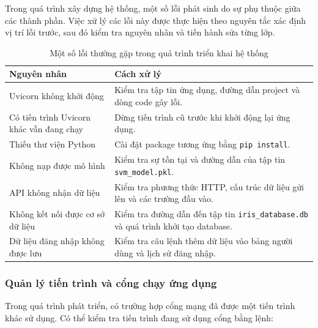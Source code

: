 \documentclass[14pt]{extarticle}
\begin{document}
	\noindent Trong quá trình xây dựng hệ thống, một số lỗi phát sinh do sự phụ thuộc giữa các thành phần. Việc xử lý các lỗi này được thực hiện theo nguyên tắc xác định vị trí lỗi trước, sau đó kiểm tra nguyên nhân và tiến hành sửa từng lớp.
	
	\begin{table}[H]
		\centering
		\caption{Một số lỗi thường gặp trong quá trình triển khai hệ thống}
		
		\begin{tabular}{|p{4.2cm}|p{8.5cm}|}
			\hline
			\textbf{Nguyên nhân} & \textbf{Cách xử lý} \\ \hline
			
			Uvicorn không khởi động &
			Kiểm tra tập tin ứng dụng, đường dẫn project và dòng code gây lỗi. \\ \hline
			
			Có tiến trình Uvicorn khác vẫn đang chạy &
			Dừng tiến trình cũ trước khi khởi động lại ứng dụng. \\ \hline
			
			Thiếu thư viện Python &
			Cài đặt package tương ứng bằng \texttt{pip install}. \\ \hline
			
			Không nạp được mô hình &
			Kiểm tra sự tồn tại và đường dẫn của tập tin \texttt{svm\_model.pkl}. \\ \hline
			
			API không nhận dữ liệu &
			Kiểm tra phương thức HTTP, cấu trúc dữ liệu gửi lên và các trường đầu vào. \\ \hline
			
			Không kết nối được cơ sở dữ liệu &
			Kiểm tra đường dẫn đến tập tin \texttt{iris\_database.db} và quá trình khởi tạo database. \\ \hline
			
			Dữ liệu đăng nhập không được lưu &
			Kiểm tra câu lệnh thêm dữ liệu vào bảng người dùng và lịch sử đăng nhập. \\ \hline
			
		\end{tabular}
	\end{table}
	\newpage
	
	\subsubsection{Quản lý tiến trình và cổng chạy ứng dụng}
	
	\noindent Trong quá trình phát triển, có trường hợp cổng mạng đã được một tiến trình khác sử dụng. Có thể kiểm tra tiến trình đang sử dụng cổng bằng lệnh:
	
\end{document}
